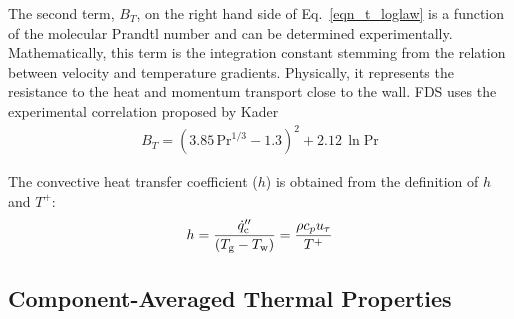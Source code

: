 The second term, $B_T$, on the right hand side of Eq.~\ref{eqn_t_loglaw} is a function of the molecular Prandtl number and can be determined experimentally. Mathematically, this term is the integration constant stemming from the relation between velocity and temperature gradients. Physically, it represents the resistance to the heat and momentum transport close to the wall. FDS uses the experimental correlation proposed by Kader~\cite{Kader:1981}
\begin{align}
\label{eqn_t_bt}
B_T =(3.85 \,\mbox{Pr}^{1/3}-1.3)^2 + 2.12 \,\ln\mbox{Pr}
\end{align}

The convective heat transfer coefficient ($h$) is obtained from the definition of $h$ and $T^+$:
\begin{align}
\label{eqn_h_model}
h = \frac{\dot{q}_{\rm c}''}{(T_{\rm g} - T_{\rm w})}= \frac{{\rho}{c_p}{u_{\tau}}}{T^+}
\end{align}


\subsection{Component-Averaged Thermal Properties}
\label{matcoefs}

